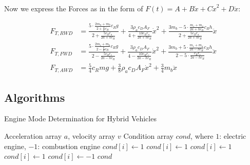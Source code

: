 Now we express the Forces as in the form of $F(t) = A + B\dot x + C\dot x^2 + D\ddot x$:

\begin{align*}
	F_{T,RWD} & = \frac{5\cdot\frac{2m_a + m_b}{2 + \frac{h}{a}c_R}c_Rg}{2 + \frac{5c_Rr_a}{2a+hc_R}}  + \frac{3\rho_a c_D A_F}{4 + \frac{10c_Rr_a}{2a+hc_R}}\dot x^2 + \frac{3m_b - 5\cdot\frac{m_c+m_a}{2a + hc_R}c_Rh}{{2 + \frac{5c_Rr_a}{2a+hc_R}}}\ddot x \\
	F_{T,FWD} & = \frac{ 5\cdot\frac{2m_c + m_b}{2 - \frac{h}{a}c_R}c_Rg}{2 - \frac{5c_Rr_c}{2a-hc_R}}  + \frac{3\rho_a c_D A_F}{4 - \frac{10c_Rr_c}{2a-hc_R}}\dot x^2 + \frac{3m_b + 5\cdot\frac{m_c+m_a}{2a - hc_R}c_Rh}{2 - 5\cdot\frac{c_Rr_c}{2a-hc_R}}\ddot x \\
	F_{T,AWD} & = \frac{5}{4}c_Rmg  + \frac{3}{8}\rho_a c_D A_F \dot x^2 + \frac{3}{4}m_b\ddot x
\end{align*}

\subsection*{Algorithms}
	\begin{algorithm}[H]
		\caption{Engine Mode Determination for Hybrid Vehicles}
		\label{alg: hyb_cond}
		\begin{algorithmic}
			\Require Acceleration array $a$, velocity array $v$
			\Ensure Condition array $cond$, where $1$: electric engine, $-1$: combustion engine
			        \State $cond[i] \gets 1$
			        \State $cond[i] \gets 1$
			        \State $cond[i] \gets 1$
			        \State $cond[i] \gets 1$
			    \Else
			        \State $cond[i] \gets -1$
			    \EndIf
			\EndFor
			\State \Return $cond$
		\end{algorithmic}
	\end{algorithm}
	
